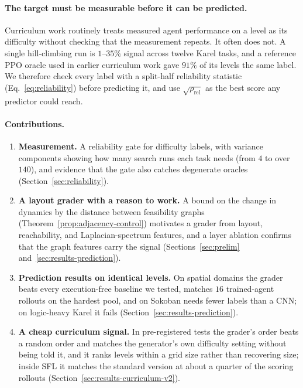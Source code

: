 \documentclass[twoside]{article}
\begin{document}
\paragraph{The target must be measurable before it can be predicted.} Curriculum work routinely treats measured agent performance on a level as its difficulty without checking that the measurement repeats. It often does not. A single hill-climbing run is $1$--$35\%$ signal across twelve Karel tasks, and a reference PPO oracle used in earlier curriculum work gave $91\%$ of its levels the same label. We therefore check every label with a split-half reliability statistic (Eq.~\ref{eq:reliability}) before predicting it, and use $\sqrt{\rho_{\mathrm{rel}}}$ as the best score any predictor could reach.

\paragraph{Contributions.}
\begin{enumerate}[leftmargin=*, itemsep=0pt, topsep=2pt]
\item \textbf{Measurement.} A reliability gate for difficulty labels, with variance components showing how many search runs each task needs (from $4$ to over $140$), and evidence that the gate also catches degenerate oracles (Section~\ref{sec:reliability}).
\item \textbf{A layout grader with a reason to work.} A bound on the change in dynamics by the distance between feasibility graphs (Theorem~\ref{prop:adjacency-control}) motivates a grader from layout, reachability, and Laplacian-spectrum features, and a layer ablation confirms that the graph features carry the signal (Sections~\ref{sec:prelim} and~\ref{sec:results-prediction}).
\item \textbf{Prediction results on identical levels.} On spatial domains the grader beats every execution-free baseline we tested, matches $16$ trained-agent rollouts on the hardest pool, and on Sokoban needs fewer labels than a CNN; on logic-heavy Karel it fails (Section~\ref{sec:results-prediction}).
\item \textbf{A cheap curriculum signal.} In pre-registered tests the grader's order beats a random order and matches the generator's own difficulty setting without being told it, and it ranks levels within a grid size rather than recovering size; inside SFL \citep{rutherford2024no} it matches the standard version at about a quarter of the scoring rollouts (Section~\ref{sec:results-curriculum-v2}).
\end{enumerate}
\end{document}
